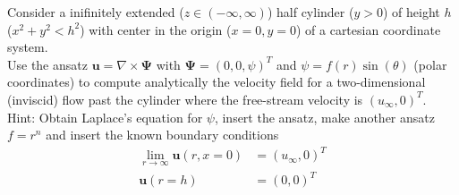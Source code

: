 \documentclass[12pt]{article}
\newcommand{\bu}{\boldsymbol{u}}
\newenvironment{exercise}[2][Exercise]{\begin{trivlist}
\item[\hskip \labelsep {\bfseries #1}\hskip \labelsep {\bfseries #2.}]}{\end{trivlist}}
\begin{document}
\begin{exercise}{6}
Consider a inifinitely extended ($z\in (-\infty,\infty)$) half cylinder ($y>0$) of height $h$ ($x^2+y^2<h^2$) 
with center in the origin ($x=0, y=0$) of a cartesian coordinate system.\\

Use the ansatz $\bu = \nabla \times \boldsymbol{\Psi}$ with $\boldsymbol{\Psi} = (0, 0, \psi)^T$ and $\psi = f(r) \sin(\theta)$ (polar coordinates)
to compute analytically the velocity field for a two-dimensional (inviscid) flow past the cylinder where the free-stream velocity is $(u_\infty, 0)^T$.\\

Hint: Obtain Laplace’s equation for $\psi$, insert the ansatz, make another ansatz $f = r^n$ and insert
the known boundary conditions
\begin{align*}
 \lim_{r\to\infty}\bu(r,x=0)&=(u_\infty,0)^T \\
 \bu(r=h)&=(0,0)^T
\end{align*}

\end{exercise}
\end{document}
